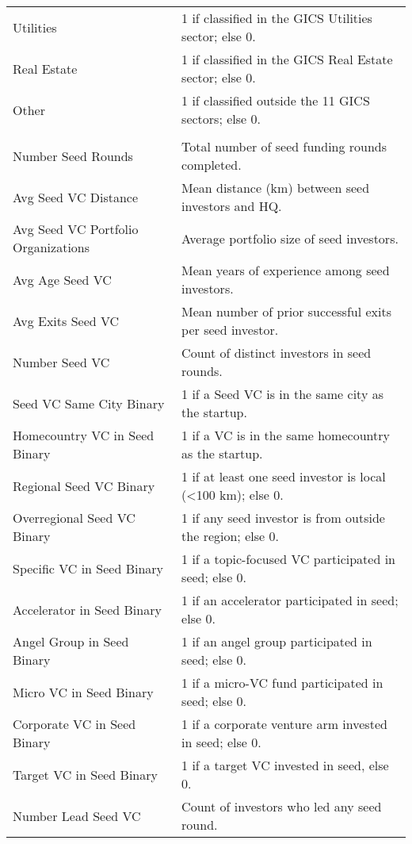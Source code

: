 {\begin{tabular}{p{} p{}}
Utilities & 1 if classified in the GICS Utilities sector; else 0. \\[0.4em]
Real Estate & 1 if classified in the GICS Real Estate sector; else 0. \\[0.4em]
Other & 1 if classified outside the 11 GICS sectors; else 0. \\[0.4em]
\addlinespace[0.5em]
\midrule
\multicolumn{2}{c}{\tiny\textsc{TREATMENT VARIABLES}} \\
\midrule
Number Seed Rounds & Total number of seed funding rounds completed. \\[0.4em]
Avg Seed VC Distance & Mean distance (km) between seed investors and HQ. \\[0.4em]
Avg Seed VC Portfolio Organizations & Average portfolio size of seed investors. \\[0.4em]
Avg Age Seed VC & Mean years of experience among seed investors. \\[0.4em]
Avg Exits Seed VC & Mean number of prior successful exits per seed investor. \\[0.4em]
Number Seed VC & Count of distinct investors in seed rounds. \\[0.4em]
Seed VC Same City Binary & 1 if a Seed VC is in the same city as the startup. \\[0.4em]
Homecountry VC in Seed Binary & 1 if a VC is in the same homecountry as the startup. \\[0.4em]
Regional Seed VC Binary & 1 if at least one seed investor is local (<100 km); else 0. \\[0.4em]
Overregional Seed VC Binary & 1 if any seed investor is from outside the region; else 0. \\[0.4em]
Specific VC in Seed Binary & 1 if a topic-focused VC participated in seed; else 0. \\[0.4em]
Accelerator in Seed Binary & 1 if an accelerator participated in seed; else 0. \\[0.4em]
Angel Group in Seed Binary & 1 if an angel group participated in seed; else 0. \\[0.4em]
Micro VC in Seed Binary & 1 if a micro-VC fund participated in seed; else 0. \\[0.4em]
Corporate VC in Seed Binary & 1 if a corporate venture arm invested in seed; else 0. \\[0.4em]
Target VC in Seed Binary & 1 if a target VC invested in seed, else 0. \\[0.4em]
Number Lead Seed VC & Count of investors who led any seed round. \\[0.4em]

\end{tabular}}
